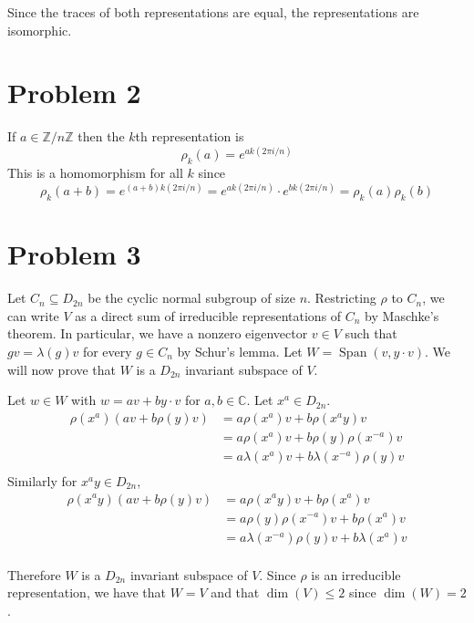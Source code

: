 \documentclass{article}
\begin{document}
Since the traces of both representations are equal,
the representations are isomorphic.
\newpage 

\section*{Problem 2}
If $a \in \mathbb{Z}/n\mathbb{Z}$ then the $k$th representation 
is 
\[
	\rho_k(a) = e^{ak(2\pi i/n)}
\]
This is a homomorphism for all $k$ since 
\[
	\rho_k(a+b) = e^{(a+b)k(2\pi i/n)} = e^{ak(2\pi i/n)}\cdot e^{bk(2\pi i/n)} = \rho_k(a)\rho_k(b)
\]
\newpage 

\section*{Problem 3}
Let $C_n \subseteq D_{2n}$ be the cyclic normal subgroup of size $n$.
Restricting $\rho$ to $C_n$, we can write $V$ as a direct
sum of irreducible representations of $C_n$ by Maschke's theorem.
In particular, we have a nonzero eigenvector $v \in V$
such that $gv = \lambda(g)v$ for every $g \in C_n$
by Schur's lemma. Let $W = \operatorname{Span}(v, y\cdot v)$.
We will now prove that $W$ is a  $D_{2n}$ invariant subspace of $V$.

Let $w \in W$ with $w = av + by\cdot v$ for $a,b \in \mathbb{C}$.
Let $x^a \in D_{2n}$.
\begin{align*}
	\rho(x^a)(av + b\rho(y)v) &=
	a\rho(x^a)v + b\rho(x^ay)v \\
	&=a\rho(x^a)v + b\rho(y)\rho(x^{-a})v \\
	&= a\lambda(x^a) v + b\lambda(x^{-a})\rho(y) v \\
\end{align*}
Similarly for $x^ay \in D_{2n}$,
\begin{align*}
	\rho(x^ay)(av + b\rho(y)v) &=
	a\rho(x^ay)v + b\rho(x^a)v \\
	&=a\rho(y)\rho(x^{-a})v + b\rho(x^{a})v \\
	&= a\lambda(x^{-a})\rho(y) v + b\lambda(x^a) v \\
\end{align*}

Therefore $W$ is a $D_{2n}$ invariant subspace of $V$.
Since $\rho$ is an irreducible representation,
we have that $W=V$ and that $\dim(V) \leq 2$
since $\dim(W) = 2$.

	
\end{document}
